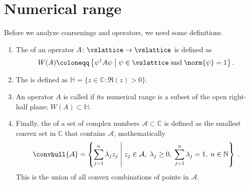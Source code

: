 \section{Numerical range}
\label{sec:chirality:nr}

Before we analyze coarsenings and operators, we need some definitions.

\begin{enumerate}
\item{
The  of an operator $A \colon \vslattice \rightarrow \vslattice$ is defined as
\begin{align} \label{eq:def:numerical:range}
W(A) \coloneqq \left\{ \psi^\dagger A \psi \; \middle| \; \psi \in \vslattice \; \text{and} \; \norm{\psi} = 1 \right\}.
\end{align}
}
\item{The  is defined as $\mathbb{H} = \{ z \in \mathbb{C} \colon \Re(z) > 0 \}$.}
\item{An operator $A$ is called  if its numerical range is a subset of the open right-half plane; $W(A) \subset \mathbb{H}$.}
\item{
Finally, the  of a set of complex numbers $\mathcal{A} \subset \mathbb{C}$ is defined as the smallest convex set in $\mathbb{C}$ that contains $\mathcal{A}$, mathematically
\begin{equation}
\convhull{\mathcal{A}} = \left\{
    \sum_{j=1}^{n} \lambda_j z_j
    \; \middle| \;
    z_j \in \mathcal{A}, \;
    \lambda_j \geq 0, \;
    \sum_{j=1}^{n} \lambda_j = 1, \;
    n \in \mathbb{N}
\right\} \;.
\end{equation}
This is the union of all convex combinations of points in $\mathcal{A}$.
}
\end{enumerate}

